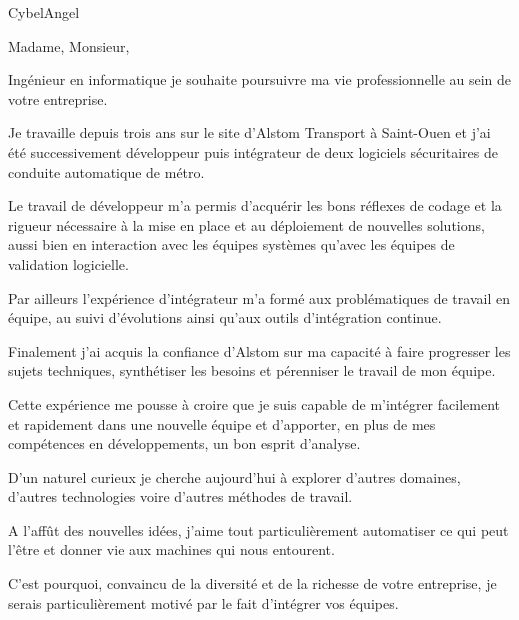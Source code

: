 \documentclass[11pt]{lettre}
\makeatletter
\newcommand*{\NoRule}{\renewcommand*{\rule@length}{0}}
\makeatother
\begin{document}
\begin{letter}{CybelAngel}

  \def\concname{Objet :~}


  \signature{Hoel IRIS}
  \address{Hoel IRIS\\
  54 avenue Mathurin Moreau\\
  75019 Paris\\
  Tel : 06 18 39 30 11\\
  E-Mail : hoel.iris@gmail.com}
  \NoRule
  \notelephone
  \nofax
    \opening{Madame, Monsieur,}


    Ingénieur en informatique je souhaite poursuivre ma vie professionnelle au sein de votre entreprise.

    Je travaille depuis trois ans sur le site d'Alstom Transport à Saint-Ouen et j'ai été successivement développeur puis intégrateur de deux logiciels sécuritaires de conduite automatique de métro.

    Le travail de développeur m'a permis d'acquérir les bons réflexes de codage et la rigueur nécessaire à la mise en place et au déploiement de nouvelles solutions, aussi bien en interaction avec les équipes systèmes qu'avec les équipes de validation logicielle.

    Par ailleurs l'expérience d'intégrateur m'a formé aux problématiques de travail en équipe, au suivi d'évolutions ainsi qu'aux outils d'intégration continue.

    Finalement j'ai acquis la confiance d'Alstom sur ma capacité à faire progresser les sujets techniques, synthétiser les besoins et pérenniser le travail de mon équipe.

    Cette expérience me pousse à croire que je suis capable de m'intégrer facilement et rapidement dans une nouvelle équipe et d'apporter, en plus de mes compétences en développements, un bon esprit d'analyse.

    D'un naturel curieux je cherche aujourd'hui à explorer d'autres domaines, d'autres technologies voire d'autres méthodes de travail.

    A l'affût des nouvelles idées, j'aime tout particulièrement automatiser ce qui peut l'être et donner vie aux machines qui nous entourent.
    
    C'est pourquoi, convaincu de la diversité et de la richesse de votre entreprise, je serais particulièrement motivé par le fait d’intégrer vos équipes.
    

\end{letter}
\end{document}
